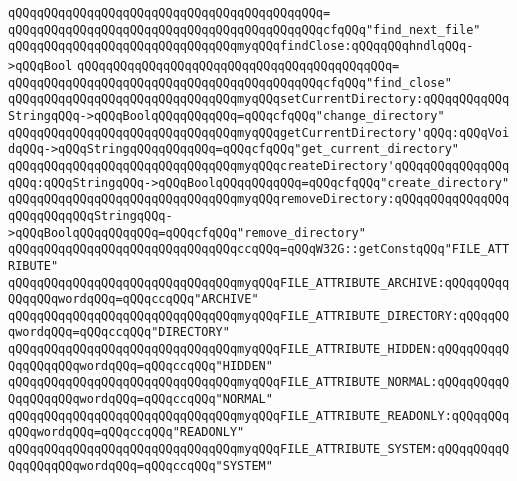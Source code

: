 \verb|qQQqqQQqqQQqqQQqqQQqqQQqqQQqqQQqqQQqqQQqqQQq=|\newline
\verb|qQQqqQQqqQQqqQQqqQQqqQQqqQQqqQQqqQQqqQQqqQQqcfqQQq"find_next_file"|\newline
\newline
\verb|qQQqqQQqqQQqqQQqqQQqqQQqqQQqqQQqmyqQQqfindClose:qQQqqQQqhndlqQQq->qQQqBool|\newline
\verb|qQQqqQQqqQQqqQQqqQQqqQQqqQQqqQQqqQQqqQQqqQQq=|\newline
\verb|qQQqqQQqqQQqqQQqqQQqqQQqqQQqqQQqqQQqqQQqqQQqcfqQQq"find_close"|\newline
\newline
\verb|qQQqqQQqqQQqqQQqqQQqqQQqqQQqqQQqmyqQQqsetCurrentDirectory:qQQqqQQqqQQqStringqQQq->qQQqBoolqQQqqQQqqQQq=qQQqcfqQQq"change_directory"|\newline
\verb|qQQqqQQqqQQqqQQqqQQqqQQqqQQqqQQqmyqQQqgetCurrentDirectory'qQQq:qQQqVoidqQQq->qQQqStringqQQqqQQqqQQq=qQQqcfqQQq"get_current_directory"|\newline
\verb|qQQqqQQqqQQqqQQqqQQqqQQqqQQqqQQqmyqQQqcreateDirectory'qQQqqQQqqQQqqQQqqQQq:qQQqStringqQQq->qQQqBoolqQQqqQQqqQQq=qQQqcfqQQq"create_directory"|\newline
\verb|qQQqqQQqqQQqqQQqqQQqqQQqqQQqqQQqmyqQQqremoveDirectory:qQQqqQQqqQQqqQQqqQQqqQQqqQQqStringqQQq->qQQqBoolqQQqqQQqqQQq=qQQqcfqQQq"remove_directory"|\newline
\newline
\verb|qQQqqQQqqQQqqQQqqQQqqQQqqQQqqQQqccqQQq=qQQqW32G::getConstqQQq"FILE_ATTRIBUTE"|\newline
\newline
\verb|qQQqqQQqqQQqqQQqqQQqqQQqqQQqqQQqmyqQQqFILE_ATTRIBUTE_ARCHIVE:qQQqqQQqqQQqqQQqwordqQQq=qQQqccqQQq"ARCHIVE"|\newline
\verb|qQQqqQQqqQQqqQQqqQQqqQQqqQQqqQQqmyqQQqFILE_ATTRIBUTE_DIRECTORY:qQQqqQQqwordqQQq=qQQqccqQQq"DIRECTORY"|\newline
\verb|qQQqqQQqqQQqqQQqqQQqqQQqqQQqqQQqmyqQQqFILE_ATTRIBUTE_HIDDEN:qQQqqQQqqQQqqQQqqQQqwordqQQq=qQQqccqQQq"HIDDEN"|\newline
\verb|qQQqqQQqqQQqqQQqqQQqqQQqqQQqqQQqmyqQQqFILE_ATTRIBUTE_NORMAL:qQQqqQQqqQQqqQQqqQQqwordqQQq=qQQqccqQQq"NORMAL"|\newline
\verb|qQQqqQQqqQQqqQQqqQQqqQQqqQQqqQQqmyqQQqFILE_ATTRIBUTE_READONLY:qQQqqQQqqQQqwordqQQq=qQQqccqQQq"READONLY"|\newline
\verb|qQQqqQQqqQQqqQQqqQQqqQQqqQQqqQQqmyqQQqFILE_ATTRIBUTE_SYSTEM:qQQqqQQqqQQqqQQqqQQqwordqQQq=qQQqccqQQq"SYSTEM"|\newline
